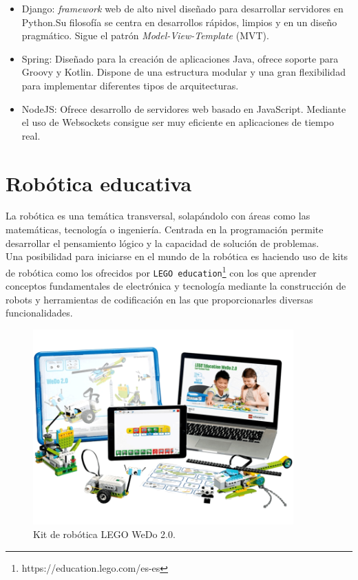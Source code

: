 \documentclass[a4paper, 12pt]{book}
\begin{document}
		\begin{itemize}
			\item Django: \textit{framework} web de alto nivel diseñado para desarrollar servidores en Python.Su filosofía se centra en desarrollos rápidos, limpios y en un diseño pragmático. Sigue el patrón \textit{Model-View-Template} (MVT).
			\item Spring: Diseñado para la creación de aplicaciones Java, ofrece soporte para Groovy y Kotlin. Dispone de una estructura modular y una gran flexibilidad para implementar diferentes tipos de arquitecturas.
			\item NodeJS: Ofrece desarrollo de servidores web basado en JavaScript. Mediante el uso de Websockets consigue ser muy eficiente en aplicaciones de tiempo real.
		\end{itemize}
		
	\section{Robótica educativa}
	\label{sec:1_robotica_edicativa}
		La robótica es una temática transversal, solapándolo con áreas como las matemáticas, tecnología o ingeniería. Centrada en la programación permite desarrollar el pensamiento lógico y la capacidad de solución de problemas. \\
		
		Una posibilidad para iniciarse en el mundo de la robótica es haciendo uso de kits de robótica como los ofrecidos por \texttt{LEGO education}\footnote{https://education.lego.com/es-es} con los que aprender conceptos fundamentales de electrónica y tecnología mediante la construcción de robots y herramientas de codificación en las que proporcionarles diversas funcionalidades. \\
		
		\begin{figure}[H]
			\centering
			\includegraphics[width=10cm, keepaspectratio]{img/lego.png}
			\caption{Kit de robótica LEGO WeDo 2.0.}
			\label{fig:lego}
		\end{figure}
		
\end{document}
